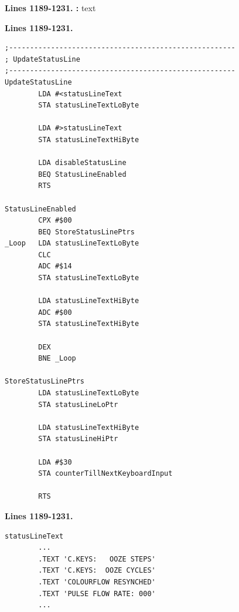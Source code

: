 \textbf{Lines 1189-1231. :} 
text
\clearpage

\clearpage
\textbf{Lines 1189-1231. } 
\begin{lstlisting}
;------------------------------------------------------
; UpdateStatusLine
;------------------------------------------------------
UpdateStatusLine
        LDA #<statusLineText
        STA statusLineTextLoByte

        LDA #>statusLineText
        STA statusLineTextHiByte

        LDA disableStatusLine
        BEQ StatusLineEnabled
        RTS 

StatusLineEnabled   
        CPX #$00
        BEQ StoreStatusLinePtrs
_Loop   LDA statusLineTextLoByte
        CLC 
        ADC #$14
        STA statusLineTextLoByte

        LDA statusLineTextHiByte
        ADC #$00
        STA statusLineTextHiByte

        DEX 
        BNE _Loop

StoreStatusLinePtrs   
        LDA statusLineTextLoByte
        STA statusLineLoPtr

        LDA statusLineTextHiByte
        STA statusLineHiPtr

        LDA #$30
        STA counterTillNextKeyboardInput

        RTS 

\end{lstlisting}
\textbf{Lines 1189-1231. } 
\begin{lstlisting}
statusLineText
        ...
        .TEXT 'C.KEYS:   OOZE STEPS'
        .TEXT 'C.KEYS:  OOZE CYCLES'
        .TEXT 'COLOURFLOW RESYNCHED'
        .TEXT 'PULSE FLOW RATE: 000'
        ...
\end{lstlisting}
\clearpage

